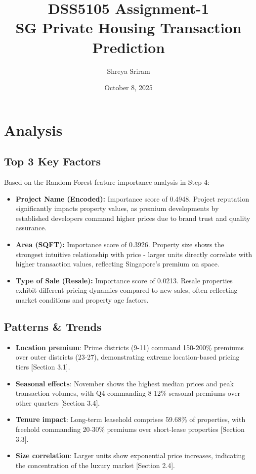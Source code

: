 \documentclass{article}
\title{DSS5105 Assignment-1 \\ SG Private Housing Transaction Prediction}
\author{Shreya Sriram}
\date{October 8, 2025}
\begin{document}
\maketitle

\section{Analysis}
\subsection{Top 3 Key Factors}
Based on the Random Forest feature importance analysis in Step 4:

\begin{itemize}
\item \textbf{Project Name (Encoded):} Importance score of 0.4948. Project reputation significantly impacts property values, as premium developments by established developers command higher prices due to brand trust and quality assurance.

\item \textbf{Area (SQFT):} Importance score of 0.3926. Property size shows the strongest intuitive relationship with price - larger units directly correlate with higher transaction values, reflecting Singapore's premium on space.

\item \textbf{Type of Sale (Resale):} Importance score of 0.0213. Resale properties exhibit different pricing dynamics compared to new sales, often reflecting market conditions and property age factors.
\end{itemize}

\subsection{Patterns & Trends}

\begin{itemize}
\item \textbf{Location premium}: Prime districts (9-11) command 150-200\% premiums over outer districts (23-27), demonstrating extreme location-based pricing tiers [Section 3.1].

\item \textbf{Seasonal effects}: November shows the highest median prices and peak transaction volumes, with Q4 commanding 8-12\% seasonal premiums over other quarters [Section 3.4].

\item \textbf{Tenure impact}: Long-term leasehold comprises 59.68\% of properties, with freehold commanding 20-30\% premiums over short-lease properties [Section 3.3].

\item \textbf{Size correlation}: Larger units show exponential price increases, indicating the concentration of the luxury market [Section 2.4].

\end{itemize}
\end{document}

